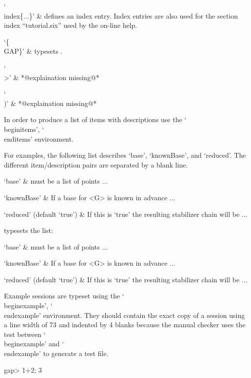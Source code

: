 `\\index\{...\}' &
    defines an index entry.  Index entries are  also used for the section
    index ``tutorial.six'' used by the on-line help.

`\{\\GAP\}' &
    typesets {\GAP}.

`\\>' &
    *@explaination missing@*

`\\)' &
    *@explaination missing@*

\enditems


In order  to   produce  a  list   of  items with   descriptions  use  the
`\\beginitems', `\\enditems' environment.

For examples, the   following  list describes   `base', `knownBase',  and
`reduced'.  The different item/description pairs are separated by a blank
line.

\begintt
  \beginitems
    `base' &
        must be a  list of points ...

    `knownBase' &
        If a base for <G> is known in advance ...

    `reduced' (default `true') &
        If this is `true' the resulting stabilizer chain will be ...
  \enditems
\endtt

typesets the list:

\beginitems
  `base' &
      must be a  list of points ...

  `knownBase' &
      If a base for <G> is known in advance ...

  `reduced' (default `true') &
      If this is `true' the resulting stabilizer chain will be ...
\enditems

Example  {\GAP}  sessions    are  typeset  using the    `\\beginexample',
`\\endexample' environment.  They should contain    the exact copy  of  a
{\GAP} session using a line width of 73 and indented  by 4 blanks because
the   manual checker     uses  the test   between  `\\beginexample'   and
`\\endexample' to generate a test file.

\begintt
  \beginexample
      gap> 1+2;
      3
  \endexample
\endtt

